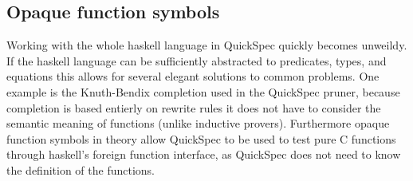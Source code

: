     \subsection{Opaque function symbols}
    Working with the whole haskell language in QuickSpec quickly becomes unweildy.
    If the haskell language can be sufficiently abstracted to predicates, types, and
    equations this allows for several elegant solutions to common problems. One
    example is the Knuth-Bendix completion used in the QuickSpec pruner, because
    completion is based entierly on rewrite rules it does not have to consider
    the semantic meaning of functions (unlike inductive provers). Furthermore
    opaque function symbols in theory allow QuickSpec to be used to test
    pure C functions through haskell's foreign function interface, as QuickSpec does
    not need to know the definition of the functions.
